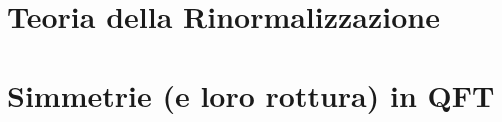 \documentclass[
	fontsize=10pt, %
	twoside=false, %
	numbers=noenddot, %
]{kaobook}
\begin{document}

\mainmatter %

\part{Teoria della Rinormalizzazione}







\part{Simmetrie (e loro rottura) in QFT}









%

\end{document}
